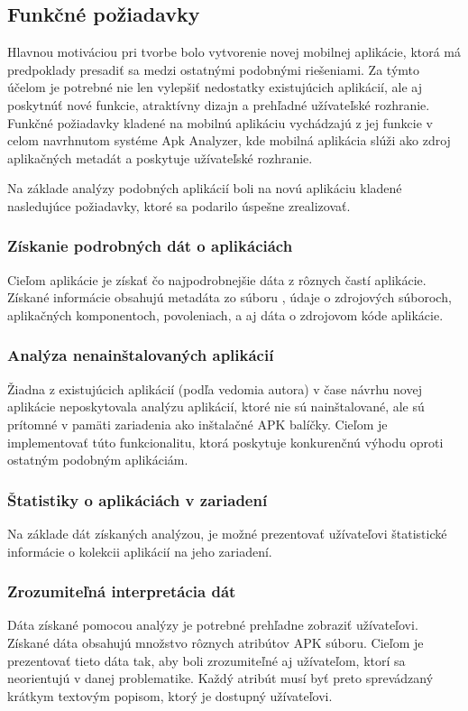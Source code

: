 \subsection{Funkčné požiadavky}
Hlavnou motiváciou pri tvorbe bolo vytvorenie novej mobilnej aplikácie, ktorá má predpoklady presadiť sa medzi ostatnými podobnými riešeniami.  Za týmto účelom je potrebné nie len vylepšiť nedostatky existujúcich aplikácií, ale aj poskytnúť nové funkcie, atraktívny dizajn a prehľadné užívateľské rozhranie.
Funkčné požiadavky kladené na mobilnú aplikáciu vychádzajú z jej funkcie v celom navrhnutom systéme Apk Analyzer, kde mobilná aplikácia slúži ako zdroj aplikačných metadát a poskytuje užívateľské rozhranie.


Na základe analýzy podobných aplikácií boli na novú aplikáciu kladené nasledujúce požiadavky, ktoré sa podarilo úspešne zrealizovať.

\subsubsection{\textbf{Získanie podrobných dát o aplikáciách}}
Cieľom aplikácie je získať čo najpodrobnejšie dáta z rôznych častí aplikácie. Získané informácie obsahujú metadáta zo súboru , údaje o zdrojových súboroch, aplikačných komponentoch, povoleniach, a aj dáta o zdrojovom kóde aplikácie. 

\subsubsection{\textbf{Analýza nenainštalovaných aplikácií}}
Žiadna z existujúcich aplikácií (podľa vedomia autora) v čase návrhu novej aplikácie neposkytovala analýzu aplikácií, ktoré nie sú nainštalované, ale sú prítomné v pamäti zariadenia ako inštalačné APK balíčky. Cieľom je implementovať túto funkcionalitu, ktorá poskytuje konkurenčnú výhodu oproti ostatným podobným aplikáciám.

\subsubsection{\textbf{Štatistiky o aplikáciách v zariadení}}
Na základe dát získaných analýzou, je možné prezentovať užívateľovi štatistické informácie o kolekcii aplikácií na jeho zariadení.

\subsubsection{\textbf{Zrozumiteľná interpretácia dát}}
Dáta získané pomocou analýzy je potrebné prehľadne zobraziť užívateľovi.  Získané dáta obsahujú množstvo rôznych atribútov APK súboru. Cieľom je prezentovať tieto dáta tak, aby boli zrozumiteľné aj užívateľom, ktorí sa neorientujú v danej problematike. Každý atribút musí byť preto sprevádzaný krátkym textovým popisom, ktorý je dostupný užívateľovi.

